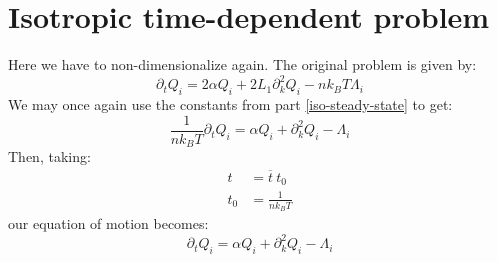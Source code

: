 \documentclass[reqno]{article}
\begin{document}
  \section{Isotropic time-dependent problem}
  Here we have to non-dimensionalize again.
  The original problem is given by:
  \begin{equation}
    \partial_t Q_i
    = 2\alpha Q_i
    + 2 L_1 \partial_k^2 Q_i
    - n k_B T \Lambda_i
  \end{equation}
  We may once again use the constants from part \ref{iso-steady-state} to get:
  \begin{equation}
    \frac{1}{n k_B T} \partial_t Q_i
    = \alpha Q_i
    + \partial_k^2 Q_i
    - \Lambda_i
  \end{equation}
  Then, taking:
  \begin{equation}
    \begin{split}
      t &= \overline{t} \: t_0 \\
      t_0 &= \frac{1}{n k_B T}
    \end{split}
  \end{equation}
  our equation of motion becomes:
  \begin{equation}
    \partial_t Q_i
    = \alpha Q_i
    + \partial_k^2 Q_i
    - \Lambda_i
  \end{equation}
  
\end{document}
